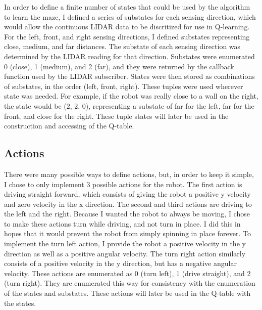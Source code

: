 \documentclass[letterpaper, 10 pt, conference]{ieeeconf}  %
\begin{document}
In order to define a finite number of states that could be used by the algorithm to learn the maze, I defined a series of substates for each sensing direction, which would allow the continuous LIDAR data to be discritized for use in Q-learning. For the left, front, and right sensing directions, I defined substates representing close, medium, and far distances. The substate of each sensing direction was determined by the LIDAR reading for that direction. Substates were enumerated 0 (close), 1 (medium), and 2 (far), and they were returned by the callback function used by the LIDAR subscriber. States were then stored as combinations of substates, in the order (left, front, right). These tuples were used wherever state was needed. For example, if the robot was really close to a wall on the right, the state would be (2, 2, 0), representing a substate of far for the left, far for the front, and close for the right. These tuple states will later be used in the construction and accessing of the Q-table.

\subsection{Actions}

There were many possible ways to define actions, but, in order to keep it simple, I chose to only implement 3 possible actions for the robot. The first action is driving straight forward, which consists of giving the robot a positive y velocity and zero velocity in the x direction. The second and third actions are driving to the left and the right. Because I wanted the robot to always be moving, I chose to make these actions turn while driving, and not turn in place. I did this in hopes that it would prevent the robot from simply spinning in place forever. To implement the turn left action, I provide the robot a positive velocity in the y direction as well as a positive angular velocity. The turn right action similarly consists of a positive velocity in the y direction, but has a negative angular velocity. These actions are enumerated as 0 (turn left), 1 (drive straight), and 2 (turn right). They are enumerated this way for consistency with the enumeration of the states and substates. These actions will later be used in the Q-table with the states.
\end{document}
